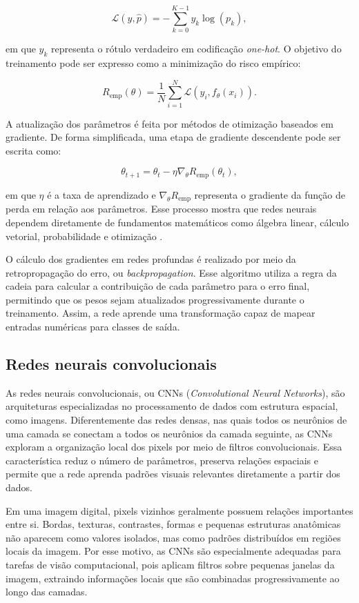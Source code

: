 \documentclass[
    12pt,
    openright,
    oneside,
    a4paper,
    english,
    brazil
]{abntex2}
\begin{document}
\[
\mathcal{L}(y,\hat{p}) =
-\sum_{k=0}^{K-1} y_k \log(p_k),
\]

em que \(y_k\) representa o rótulo verdadeiro em codificação \textit{one-hot}. O objetivo do treinamento pode ser expresso como a minimização do risco empírico:

\[
R_{\text{emp}}(\theta) =
\frac{1}{N}
\sum_{i=1}^{N}
\mathcal{L}(y_i, f_{\theta}(x_i)).
\]

A atualização dos parâmetros é feita por métodos de otimização baseados em gradiente. De forma simplificada, uma etapa de gradiente descendente pode ser escrita como:

\[
\theta_{t+1}
=
\theta_t
-
\eta \nabla_{\theta}R_{\text{emp}}(\theta_t),
\]

em que \(\eta\) é a taxa de aprendizado e \(\nabla_{\theta}R_{\text{emp}}\) representa o gradiente da função de perda em relação aos parâmetros. Esse processo mostra que redes neurais dependem diretamente de fundamentos matemáticos como álgebra linear, cálculo vetorial, probabilidade e otimização \cite{deisenroth2020mathematics}.

O cálculo dos gradientes em redes profundas é realizado por meio da retropropagação do erro, ou \textit{backpropagation}. Esse algoritmo utiliza a regra da cadeia para calcular a contribuição de cada parâmetro para o erro final, permitindo que os pesos sejam atualizados progressivamente durante o treinamento. Assim, a rede aprende uma transformação capaz de mapear entradas numéricas para classes de saída.

\subsection{Redes neurais convolucionais}
\label{subsec:redes_neurais_convolucionais}

As redes neurais convolucionais, ou CNNs (\textit{Convolutional Neural Networks}), são arquiteturas especializadas no processamento de dados com estrutura espacial, como imagens. Diferentemente das redes densas, nas quais todos os neurônios de uma camada se conectam a todos os neurônios da camada seguinte, as CNNs exploram a organização local dos pixels por meio de filtros convolucionais. Essa característica reduz o número de parâmetros, preserva relações espaciais e permite que a rede aprenda padrões visuais relevantes diretamente a partir dos dados.

Em uma imagem digital, pixels vizinhos geralmente possuem relações importantes entre si. Bordas, texturas, contrastes, formas e pequenas estruturas anatômicas não aparecem como valores isolados, mas como padrões distribuídos em regiões locais da imagem. Por esse motivo, as CNNs são especialmente adequadas para tarefas de visão computacional, pois aplicam filtros sobre pequenas janelas da imagem, extraindo informações locais que são combinadas progressivamente ao longo das camadas.
\end{document}
